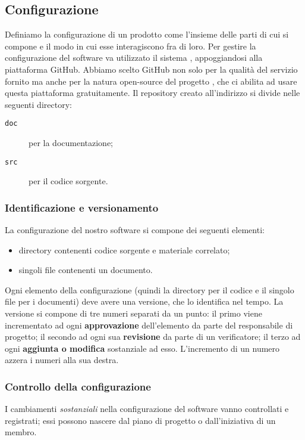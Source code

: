 \subsection{Configurazione} \label{sec:config}
Definiamo la configurazione di un prodotto come l'insieme delle parti di cui si compone e il modo in cui esse interagiscono fra di loro. Per gestire la configurazione del software va utilizzato il sistema , appoggiandosi alla piattaforma GitHub. Abbiamo scelto GitHub non solo per la qualità del servizio fornito ma anche per la natura open-source del progetto \proj, che ci abilita ad usare questa piattaforma gratuitamente. Il repository creato all'indirizzo \repo{} si divide nelle seguenti directory:
\begin{description}
	\item[\texttt{doc}] per la documentazione;
	\item[\texttt{src}] per il codice sorgente.
\end{description}

\subsubsection{Identificazione e versionamento} \label{sec:idvers}
La configurazione del nostro software si compone dei seguenti elementi:
\begin{itemize}
	\item directory contenenti codice sorgente e materiale correlato;
	\item singoli file contenenti un documento.
\end{itemize}
Ogni elemento della configurazione (quindi la directory per il codice e il singolo file per i documenti) deve avere una versione, che lo identifica nel tempo. La versione si compone di tre numeri separati da un punto: il primo viene incrementato ad ogni \textbf{approvazione} dell'elemento da parte del responsabile di progetto; il secondo ad ogni sua \textbf{revisione} da parte di un verificatore; il terzo ad ogni \textbf{aggiunta o modifica} sostanziale ad esso. L'incremento di un numero azzera i numeri alla sua destra.

\subsubsection{Controllo della configurazione} I cambiamenti \emph{sostanziali} nella configurazione del software vanno controllati e registrati; essi possono nascere dal piano di progetto o dall'iniziativa di un membro.
